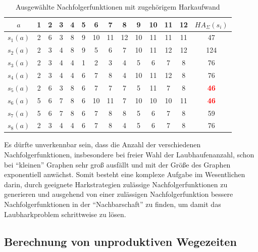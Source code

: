 \documentclass[fontsize=12pt,doubleside,openany,listof=totoc,listof=flat,listof=nochaptergap,numbers=noenddot]{scrbook}
\theoremstyle{style}
\begin{document}
\renewcommand{\arraystretch}{0.75}
\begin{table}[H]
\caption{Ausgewählte Nachfolgerfunktionen mit zugehörigem Harkaufwand}
\label{HJKmlp_table_AuswahlNachfolgerfunktionen}
\centering 
\begin{tabular}{|>{}c|>{}c|>{}c|>{}c|>{}c|>{}c|>{}c|>{}c|>{}c|>{}c|>{}c|>{}c|>{}c|>{}c|}
\hline
$a$ & 1&2 &3 &4 &5 & 6 & 7 & 8 & 9 & 10 & 11 & 12 & $HA_\Sigma (s_i)$\\
\hline
$s_1(a)$ & 2 & 6 & 3 & 8 & 9 & 10 & 11 & 12 & 10 & 11 & 11 & 11 & 47 \\
$s_2(a)$ & 2 & 3 & 4 & 8 & 9 &  5 &  6 &  7 & 10 & 11 & 12 & 12 &124 \\
$s_3(a)$ & 2 & 3 & 4 & 4 & 1 &  2 &  3 &  4 &  5 &  6 &  7 &  8 & 76 \\
$s_4(a)$ & 2 & 3 & 4 & 4 & 6 &  7 &  8 &  4 & 10 & 11 & 12 &  8 & 76 \\
$s_5(a)$ & 2 & 6 & 3 & 8 & 6 &  7 &  7 &  7 &  5 & 11 &  7 &  8 & \textcolor{red}{\textbf{46}} \\
$s_6(a)$ & 5 & 6 & 7 & 8 & 6 & 10 & 11 &  7 & 10 & 10 & 10 & 11 & \textcolor{red}{\textbf{46}}\\
$s_7(a)$ & 5 & 6 & 7 & 8 & 6 &  7 &  8 &  8 &  5 &  6 &  7 &  8 & 59 \\
$s_8(a)$ & 2 & 3 & 4 & 4 & 6 &  7 &  8 &  4 &  5 &  6 &  7 &  8 & 76 \\
\hline
\end{tabular}
\end{table}
\renewcommand{\arraystretch}{1}

\noindent Es dürfte unverkennbar sein, dass die Anzahl der verschiedenen Nachfolgerfunktionen, insbesondere bei freier Wahl der Laubhaufenanzahl, schon bei "`kleinen"' Graphen sehr groß ausfällt und mit der Größe des Graphen exponentiell anwächst. Somit besteht eine komplexe Aufgabe im Wesentlichen darin, durch geeignete Harkstrategien zulässige Nachfolgerfunktionen zu generieren und ausgehend von einer zulässigen Nachfolgerfunktion bessere Nachfolgerfunktionen in der "`Nachbarschaft"' zu finden, um damit das Laubharkproblem schrittweise zu lösen.





\subsection{Berechnung von unproduktiven Wegezeiten}
\label{subsectionWegezeitenberechnung}
\end{document}
